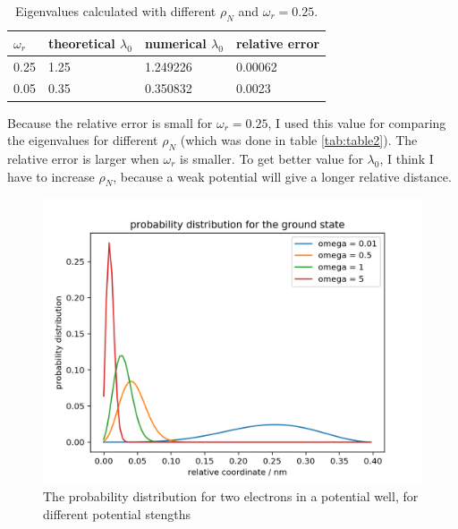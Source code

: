 \documentclass{article}
\begin{document}
\begin{table}[h!]
  \centering
  \caption{Eigenvalues calculated with different $\rho_N$ and $\omega_r =0.25$.}
  \label{tab:table3}
  \begin{tabular}{l||l|l|l}
  $\omega_r$ & theoretical $\lambda_0$ & numerical $\lambda_0$ & relative error\\

    \hline
    0.25  & 1.25 & 1.249226 & 0.00062 \\
    \hline
    0.05 & 0.35 & 0.350832 & 0.0023 \\
    

  \end{tabular}
\end{table}



    
Because the relative error is small for $\omega_r=0.25$, I used this value for comparing the eigenvalues for different $\rho_N$ (which was done in table \ref{tab:table2}). The relative error is larger when $\omega_r$ is smaller. To get  better value for $\lambda_0$, I think I have to increase $\rho_N$, because a weak potential will give a longer relative distance. 

\begin{figure}
  \includegraphics[width=\linewidth]{ground_state.png}
  \caption{The probability distribution for two electrons in a potential well, for different potential stengths}
  \label{fig:ground_state}
\end{figure}
\end{document}
